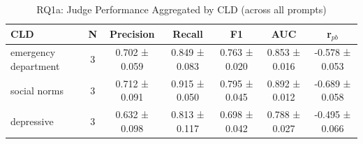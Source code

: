 \begin{table}[htbp]
\centering
\caption{RQ1a: Judge Performance Aggregated by CLD (across all prompts)}
\label{tab:rq1a_by_cld}
\begin{tabular}{lcccccc}
\toprule
\textbf{CLD} & \textbf{N} & \textbf{Precision} & \textbf{Recall} & \textbf{F1} & \textbf{AUC} & \textbf{r$_{pb}$} \\
\midrule
emergency department & 3 & 0.702 ± 0.059 & 0.849 ± 0.083 & 0.763 ± 0.020 & 0.853 ± 0.016 & -0.578 ± 0.053 \\
social norms & 3 & 0.712 ± 0.091 & 0.915 ± 0.050 & 0.795 ± 0.045 & 0.892 ± 0.012 & -0.689 ± 0.058 \\
depressive & 3 & 0.632 ± 0.098 & 0.813 ± 0.117 & 0.698 ± 0.042 & 0.788 ± 0.027 & -0.495 ± 0.066 \\
\bottomrule
\end{tabular}
\end{table}